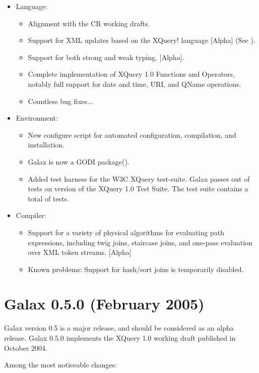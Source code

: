 \begin{itemize}
\item Language: 
  \begin{itemize}
  \item Alignment with the \xqueryversion CR working drafts. 
  \item Support for XML updates based on the XQuery! language [Alpha]   
  (See {\xquerybangurl}). 
  \item  Support for both strong and weak typing. [Alpha]. 
  \item Complete implementation of XQuery 1.0 Functions and Operators,
    notably full support for date and time, URI, and QName operations.
  \item Countless bug fixes...
  \end{itemize}
\item Environment:
  \begin{itemize}
  \item New configure script for automated configuration, compilation,
  and installation.  
  \item Galax is now a GODI package({\godiurl}).
  \item Added test harness for the W3C XQuery test-suite.
  Galax passes \textbf{\galaxpassestests} out of \textbf{\galaxtotaltests} tests on version
  \textbf{\xquerytestsuiteversion} of the XQuery 1.0 Test Suite.  The test
  suite contains a total of \textbf{\totaltests} tests. 
  \end{itemize}
\item Compiler:
  \begin{itemize}
  \item Support for a variety of physical algorithms for evaluating
  path expressions, including twig joins, staircase joins, and
  one-pass evaluation over XML token streams. [Alpha]
  \item Known problems:  Support for hash/sort joins is temporarily disabled.
  \end{itemize}
\end{itemize}

\section{Galax 0.5.0 (February 2005)}

Galax version 0.5 is a major release, and should be considered as an
alpha release. Galax 0.5.0 implements the XQuery 1.0 working draft
published in October 2004.

Among the most noticeable changes:

